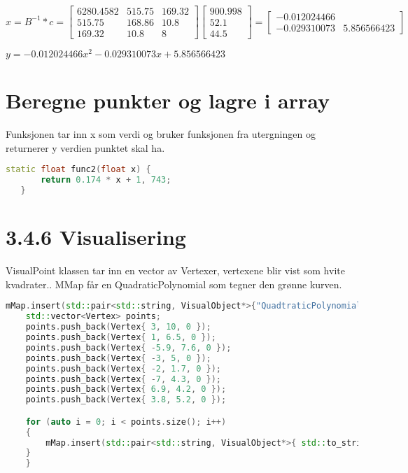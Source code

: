 \documentclass[a4paper,norsk]{article}
\begin{document}
\begin{equation*}
x = B^{-1} * c = \begin{bmatrix}  6280.4582 & 515.75 & 169.32 \\ 515.75 & 168.86 & 10.8 \\ 169.32 & 10.8 & 8  \end{bmatrix}\begin{bmatrix} 900.998 \\52.1 \\44.5 \end{bmatrix}
= \begin{bmatrix}-0.012024466 \\ -0.029310073 & 5.856566423 \end{bmatrix}
\end{equation*}

$y =-0.012024466x^{2}-0.029310073x+5.856566423$
\section{Beregne punkter og lagre i array}
Funksjonen tar inn x som verdi og bruker funksjonen fra utergningen og returnerer y verdien punktet skal ha.
\begin{lstlisting}[language=C++, caption={trianglesurface.h}]
static float func2(float x) {
       return 0.174 * x + 1, 743;
   }
\end{lstlisting}
\section{3.4.6 Visualisering}
VisualPoint klassen tar inn en vector av Vertexer, vertexene blir vist som hvite kvadrater.. MMap får en QuadraticPolynomial som tegner den grønne kurven.
\begin{lstlisting}[language=C++, caption={renderwindow.cpp}]
    mMap.insert(std::pair<std::string, VisualObject*>{"QuadtraticPolynomial", new QuadtraticPolynomial(-0.012024466, -0.029310073f, 5.856566423f, 0.1f)});
    std::vector<Vertex> points;
    points.push_back(Vertex{ 3, 10, 0 });
    points.push_back(Vertex{ 1, 6.5, 0 });
    points.push_back(Vertex{ -5.9, 7.6, 0 });
    points.push_back(Vertex{ -3, 5, 0 });
    points.push_back(Vertex{ -2, 1.7, 0 });
    points.push_back(Vertex{ -7, 4.3, 0 });
    points.push_back(Vertex{ 6.9, 4.2, 0 });
    points.push_back(Vertex{ 3.8, 5.2, 0 });

    for (auto i = 0; i < points.size(); i++) 
    {
        mMap.insert(std::pair<std::string, VisualObject*>{ std::to_string(i), new VisualPoint(points)});
    }
    }
\end{lstlisting}
\end{document}
